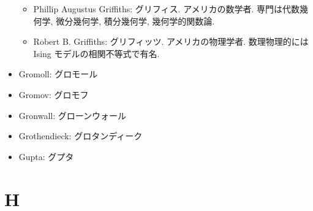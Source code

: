\documentclass[openany, a4paper, oneside]{jsbook}
\begin{document}
\begin{itemize}
\begin{itemize}
\item Phillip Augustus Griffiths: グリフィス. アメリカの数学者. 専門は代数幾何学, 微分幾何学, 積分幾何学, 幾何学的関数論.
\item Robert B. Griffiths: グリフィッツ. アメリカの物理学者. 数理物理的には Ising モデルの相関不等式で有名.
\end{itemize}
\item Gromoll: グロモール
\item Gromov: グロモフ
\item Gronwall: グローンウォール
\item Grothendieck: グロタンディーク
\item Gupta: グプタ
\end{itemize}
\section{H}
\end{document}
